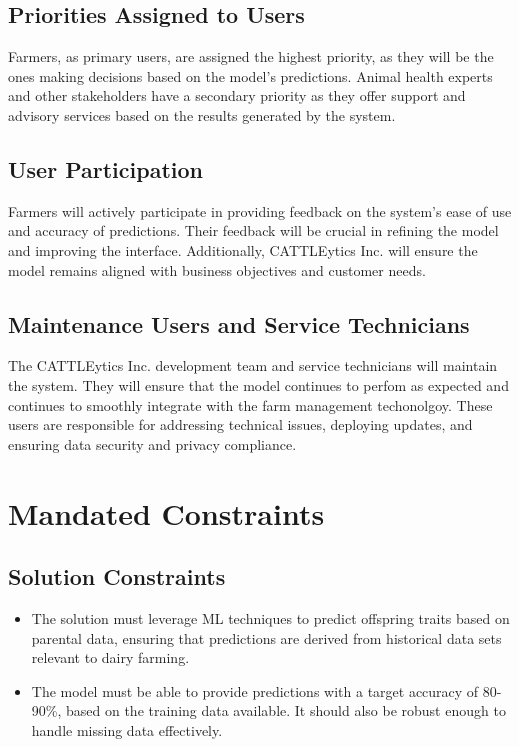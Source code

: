 \documentclass[12pt]{article}
\begin{document}
\subsection{Priorities Assigned to Users}
Farmers, as primary users, are assigned the highest priority, as they will be 
the ones making decisions based on the model's predictions. Animal health 
experts and other stakeholders have a secondary priority as they offer support 
and advisory services based on the results generated by the system.

\subsection{User Participation}
Farmers will actively participate in providing feedback on the system's ease of 
use and accuracy of predictions. Their feedback will be crucial in refining the 
model and improving the interface. Additionally, CATTLEytics Inc. will ensure 
the model remains aligned with business objectives and customer needs.

\subsection{Maintenance Users and Service Technicians}
The CATTLEytics Inc. development team and service technicians will maintain the 
system. They will ensure that the model continues to perfom as expected and 
continues to smoothly integrate with the farm management techonolgoy. These users are responsible for addressing technical issues, deploying updates, and 
ensuring data security and privacy compliance.

\section{Mandated Constraints}

\subsection{Solution Constraints}
\begin{itemize}
    \item The solution must leverage ML techniques to predict offspring traits 
    based on parental data, ensuring that predictions are derived from 
    historical data sets relevant to dairy farming.
    \item The model must be able to provide predictions with a target accuracy 
    of 80-90\%, based on the training data available. It should also be robust 
    enough to handle missing data effectively. 
\end{itemize}
\end{document}
